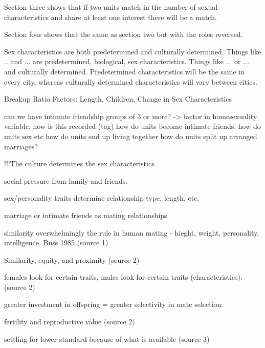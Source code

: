 Section three shows that if two units match in the number of sexual characteristics and share at least one interest there will be a match.

Section four shows that the same as section two but with the roles reversed.







Sex characteristics are both predetermined and culturally determined. Things like .. and ... are predetermined, biological, sex characteristics. Things like ... or ... and culturally determined. Predetermined characteristics will be the same in every city, whereas culturally determined characteristics will vary between cities. 


Breakup Ratio Factors: Length, Children, Change in Sex Characteristics





can we have intimate friendship groups of 3 or more? -> factor in homesexuality variable.
how is this recorded (tag)
how do units become intimate friends.
how do units sex etc
how do units end up living together
how do units split up
arranged marriages?


!!!The culture determines the sex characteristics.

social pressure from family and friends.

sex/personality traits determine relationship type, length, etc.

marriage or intimate friends as mating relationships.

similarity overwhelmingly the rule in human mating - hieght, weight, personality, intelligence. Buss 1985 (source 1)

Similarity, equity, and proximity (source 2)

females look for certain traits, males look for certain traits (characteristics).(source 2)

greater investment in offspring = greater selectivity in mate selection.

fertility and reproductive value (source 2)

settling for lower standard because of what is available (source 3)

